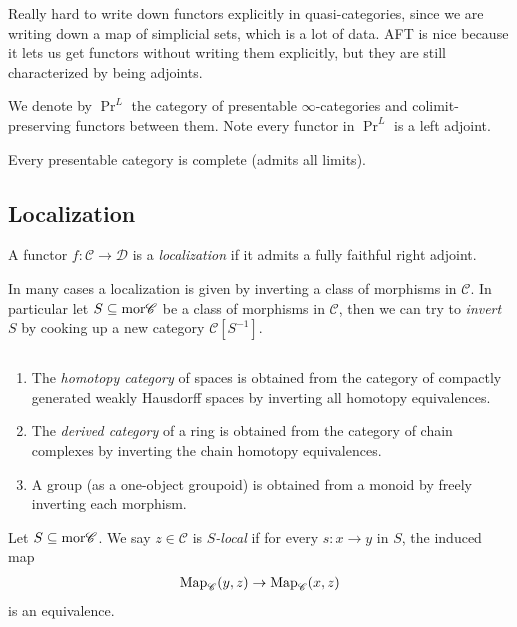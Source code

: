 \documentclass[11pt,openany]{book}
\begin{document}
Really hard to write down functors explicitly in quasi-categories, since we are writing down a map of simplicial sets, which is a lot of data. AFT is nice because it lets us get functors without writing them explicitly, but they are still characterized by being adjoints.

\begin{notation}\label{nota:PrL}  We denote by $\Pr^L$ the category of presentable $\infty$-categories and colimit-preserving functors between them. Note every functor in $\Pr^L$ is a left adjoint.
\end{notation}

\begin{theorem} Every presentable category is complete (admits all limits).
\end{theorem}


\subsection{Localization}

\begin{definition} \cite[5.2.7.2]{HTT} A functor $f \colon \mathscr{C}\to \mathscr{D}$ is a \textit{localization} if it admits a fully faithful right adjoint.
\end{definition}

In many cases a localization is given by inverting a class of morphisms in $\mathscr{C}$. In particular let $S \subseteq \mathrm{mor} \mathscr{C}$ be a class of morphisms in $\mathscr{C}$, then we can try to \textit{invert} $S$ by cooking up a new category $\mathscr{C}[S^{-1}]$.

\begin{example} $\ $
\begin{enumerate}
    \item The \textit{homotopy category} of spaces is obtained from the category of compactly generated weakly Hausdorff spaces by inverting all homotopy equivalences.
    \item The \textit{derived category} of a ring is obtained from the category of chain complexes by inverting the chain homotopy equivalences.
    \item A group (as a one-object groupoid) is obtained from a monoid by freely inverting each morphism.
\end{enumerate}
\end{example}



\begin{definition} \cite[5.5.4.1]{HTT} Let $S \subseteq \mathrm{mor} \mathscr{C}$. We say $z\in \mathscr{C}$ is $S$\textit{-local} if for every $s \colon x \to y$ in $S$, the induced map
\begin{align*}
    \mathrm{Map}_{\mathscr{C}}(y,z) \to \mathrm{Map}_{\mathscr{C}}(x,z)
\end{align*}
is an equivalence.
\end{definition}
\end{document}
